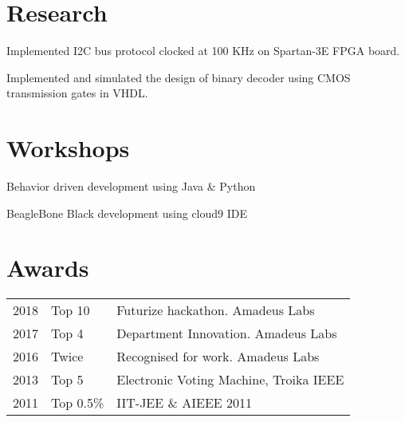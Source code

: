 \documentclass[]{Resume_Piyush}
\begin{document}
\begin{minipage}[t]{0.66\textwidth}

\section{Research}
Implemented I2C bus protocol clocked at 100 KHz on Spartan-3E FPGA board. 

Implemented and simulated the design of binary decoder using CMOS transmission gates in VHDL.
\sectionsep


\section{Workshops}
Behavior driven development using Java \& Python
\sectionsep

BeagleBone Black development using cloud9 IDE
\sectionsep


\section{Awards} 
\begin{tabular}{rll}
2018  &  Top 10  &  Futurize hackathon. Amadeus Labs\\
2017  &  Top 4  & Department Innovation. Amadeus Labs\\
2016  &  Twice & Recognised for work. Amadeus Labs\\
2013  &  Top 5 & Electronic Voting Machine, Troika IEEE\\
2011  &  Top 0.5\% & IIT-JEE \& AIEEE 2011\\
\end{tabular}
\sectionsep


\end{minipage} 
\end{document}
